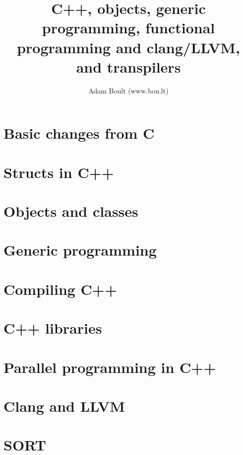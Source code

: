 \documentclass[oneside]{book}
\begin{document}
\author{Adam Boult (www.bou.lt)}
\title{C++, objects, generic programming, functional programming and clang/LLVM, and transpilers}
\maketitle

\setcounter{tocdepth}{0}
\tableofcontents



\part{Basic changes from C}








\part{Structs in C++}




\part{Objects and classes}



\part{Generic programming}




\part{Compiling C++}



\part{C++ libraries}




\part{Parallel programming in C++}

\part{Clang and LLVM}


\part{SORT}

\end{document}
